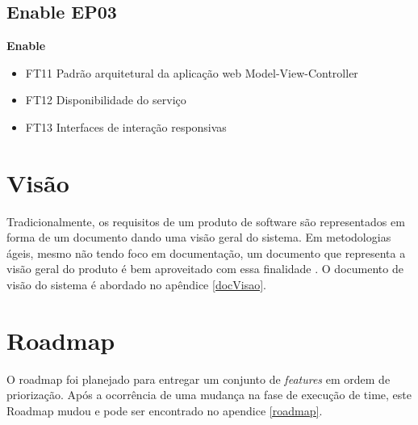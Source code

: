 \subsection{Enable EP03}
\textbf{Enable}
\begin{itemize}
    \item FT11 Padrão arquitetural da aplicação web Model-View-Controller
    \item FT12 Disponibilidade do serviço
    \item FT13 Interfaces de interação responsivas
\end{itemize}
\section{Visão}

Tradicionalmente, os requisitos de um produto de software são representados em forma de um documento dando uma visão geral do sistema. Em metodologias ágeis, mesmo não tendo foco em documentação, um documento que representa a visão geral do produto é bem aproveitado com essa finalidade \cite{leffingwell2011}. O documento de visão do sistema é abordado no apêndice \ref{docVisao}.

\section{Roadmap}

O roadmap foi planejado para entregar um conjunto de \textit{features} em ordem de priorização. Após a ocorrência de uma mudança na fase de execução de time, este Roadmap mudou e pode ser encontrado no apendice \ref{roadmap}.

